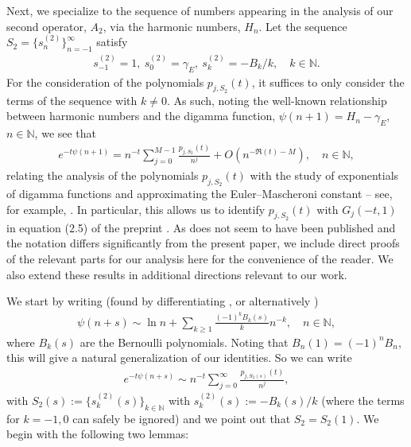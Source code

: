 \documentclass[letterpaper,10pt]{amsart}
\newcommand{\N}{\mathbb N}
\numberwithin{equation}{section}
\begin{document}
Next, we specialize to the sequence of numbers appearing in the analysis of our second operator, $A_2$, via the harmonic numbers, $H_n$. Let the sequence $S_2=\{s_n^{(2)}\}_{n=-1}^\infty$ satisfy
\begin{align}\label{Eq:S2}
 s_{-1}^{(2)}=1,\ s_0^{(2)}=\gamma_E,\ s_k^{(2)}=-B_k/k,\quad k\in\mathbb{N}.
\end{align} 
For the consideration of the polynomials $p_{j,S_2}(t)$, it suffices to only consider the terms of the sequence with $k\neq0$. As such, noting the well-known relationship between harmonic numbers and the digamma function, $\psi(n+1)=H_n-\gamma_E,$ $n\in\mathbb{N}$, we see that \begin{align}\label{Eq:68}
    e^{-t\psi(n+1)} = n^{-t}\sum_{j=0}^{M-1}\frac{p_{j,S_2}(t)}{n^j}+O(n^{-\Re(t)-M}),\quad n\in\mathbb{N},
\end{align}
relating the analysis of the polynomials $p_{j,S_2}(t)$ with the study of exponentials of digamma functions and approximating the Euler--Mascheroni constant -- see, for example, \cite{CEV13,Ya12}.
In particular, this allows us to identify $p_{j,S_2}(t)$ with $G_j(-t,1)$ in equation (2.5) of the preprint \cite{E13}. As \cite{E13} does not seem to have been published and the notation differs significantly from the present paper, we include direct proofs of the relevant parts for our analysis here for the convenience of the reader. We also extend these results in additional directions relevant to our work. 

We start by writing (found by differentiating \cite[Eq. 5.11.8]{DLMF}, or alternatively \cite[Eq. 2.11.9]{Luke69})
\begin{align}
    \psi(n+s) \sim \ln n +\sum_{k\geq 1}\frac{(-1)^k B_{k}(s)}{k}n^{-k},\quad n\in\mathbb{N},
\end{align}
where $B_{k}(s)$ are the Bernoulli polynomials. Noting that $B_n(1)=(-1)^nB_n$, this will give a natural generalization of our identities. So we can write 
\begin{align}
    e^{-t\psi(n+s)} \sim n^{-t}\sum_{j=0}^{\infty} \frac{p_{j,S_2(s)}(t)}{n^j},
\end{align}
with $S_2(s):=\{s_k^{(2)}(s)\}_{k \in \N}$ with $s_k^{(2)}(s):=-B_k(s)/k$ (where the terms for $k=-1,0$ can safely be ignored) and we point out that $S_2=S_2(1)$. We begin with the following two lemmas:
\end{document}
